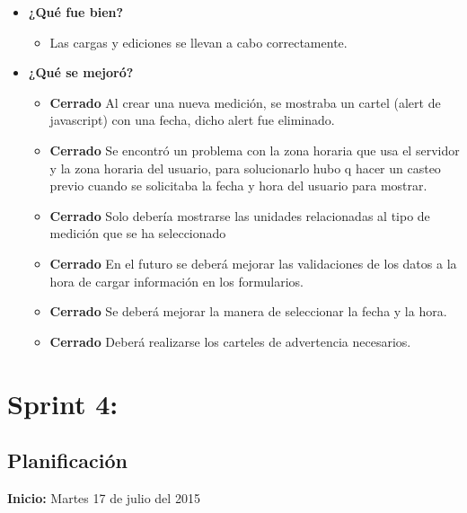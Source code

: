 \documentclass[a4paper,12pt]{article}
\begin{document}
	\begin{itemize}
		\item \textbf{¿Qué fue bien?}
        	\begin{itemize}
				\item        Las cargas y ediciones se llevan a cabo correctamente.
			\end{itemize}

   		\item \textbf{¿Qué se mejoró?}
        	\begin{itemize}
				\item \textbf{Cerrado} Al crear una nueva medición, se mostraba un cartel (alert de javascript) con una fecha, dicho alert fue eliminado.
                \item \textbf{Cerrado} Se encontró un problema con la zona horaria que usa el servidor y la zona horaria del usuario, para solucionarlo hubo q hacer un casteo previo cuando se solicitaba la fecha y hora del usuario para mostrar.
			\end{itemize}

        	\begin{itemize}
		        \item \textbf{Cerrado} Solo debería mostrarse las unidades relacionadas al tipo de medición que se ha seleccionado 
				\item \textbf{Cerrado} En el futuro se deberá mejorar las validaciones de los datos a la hora de cargar información en los formularios.
        		\item \textbf{Cerrado} Se deberá mejorar la manera de seleccionar la fecha y la hora. 
                \item \textbf{Cerrado} Deberá realizarse los carteles de advertencia necesarios.
            \end{itemize}
       
	\end{itemize}
\section{Sprint 4: }%
\subsection{Planificación}

\textbf{Inicio: }Martes 17 de julio del 2015 
\end{document}
